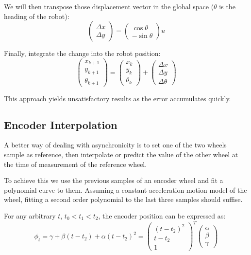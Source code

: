 \documentclass[a4paper, 10pt]{article}
\begin{document}
We will then transpose those displacement vector in the global space ($\theta$ is the heading of the robot):
\begin{equation}
    \begin{pmatrix}
        \Delta x\\\Delta y
    \end{pmatrix}
    =
    \begin{pmatrix}
        \cos\theta \\-\sin\theta
    \end{pmatrix}
    u
\end{equation}

Finally, integrate the change into the robot position:
\begin{equation}
    \begin{pmatrix}
        x_{k+1}\\
        y_{k+1}\\
        \theta_{k+1}
    \end{pmatrix}
    =
    \begin{pmatrix}
        x_{k}\\
        y_{k}\\
        \theta_{k}
    \end{pmatrix}
    +
    \begin{pmatrix}
        \Delta x\\\Delta y\\\Delta \theta
    \end{pmatrix}
\end{equation}

This approach yields unsatisfactory results as the error accumulates quickly.

\subsection{Encoder Interpolation}
A better way of dealing with asynchronicity is to set one of the two wheels sample as reference, then interpolate or predict the value of the other wheel at the time of measurement of the reference wheel.

To achieve this we use the previous samples of an encoder wheel and fit a polynomial curve to them.
Assuming a constant acceleration motion model of the wheel, fitting a second order polynomial to the last three samples should suffise.

For any arbitrary $t$, $t_0 < t_1 < t_2$, the encoder position can be expressed as:
\begin{equation}
    \phi_t
    = \gamma + \beta (t - t_2) + \alpha (t - t_2)^2
    =
    \begin{pmatrix}
        (t - t_2)^2 \\
        t - t_2 \\
        1
    \end{pmatrix}^T
    \begin{pmatrix}
        \alpha \\
        \beta \\
        \gamma
    \end{pmatrix}
    \label{eqn:encoder_parabola}
\end{equation}
\end{document}
